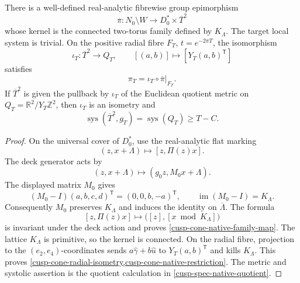 \begin{lemma}
\label{cusp-cone-native-descent}
There is a well-defined real-analytic fibrewise group epimorphism
\begin{equation}
 \overline\pi:N_0\setminus W
 \longrightarrow D_0^*\times\overline T^2
 \label{cusp-cone-native-family-map}
\end{equation}
whose kernel is the connected two-torus family defined by \(K_\Lambda\).
The target local system is trivial.  On the positive radial fibre \(F_T\),
\(t=e^{-2\pi T}\), the isomorphism
\begin{equation}
 \iota_T:\overline T^2\longrightarrow Q_T,\qquad
 [(a,b)]\longmapsto[Y_T(a,b)^{\mathsf T}]
 \label{cusp-cone-radial-isometry}
\end{equation}
satisfies
\begin{equation}
 \pi_T=\iota_T\circ\overline\pi|_{F_T}.
 \label{cusp-cone-native-restriction}
\end{equation}
If \(\overline T^2\) is given the pullback by \(\iota_T\) of the
Euclidean quotient metric on \(Q_T=\mathbb R^2/Y_T\mathbb Z^2\), then
\(\iota_T\) is an isometry and
\begin{equation}
 \operatorname{sys}(\overline T^2,g_T)
 =\operatorname{sys}(Q_T)\geq T-C.
 \label{cusp-cone-native-systole}
\end{equation}
\end{lemma}

\begin{proof}
On the universal cover of \(D_0^*\), use the real-analytic flat marking
\[
 (z,x+\Lambda)\longmapsto[z,\Pi(z)x].
\]
The deck generator acts by
\[
 (z,x+\Lambda)\longmapsto(g_0z,M_0x+\Lambda).
\]
The displayed matrix \(M_0\) gives
\begin{equation}
 (M_0-I)(a,b,c,d)^{\mathsf T}=(0,0,b,-a)^{\mathsf T},\qquad
 \operatorname{im}(M_0-I)=K_\Lambda.
 \label{cusp-cone-monodromy-image}
\end{equation}
Consequently \(M_0\) preserves \(K_\Lambda\) and induces the identity on
\(\overline\Lambda\).  The formula
\[
 [z,\Pi(z)x]\longmapsto
 \bigl([z],[x\bmod K_\Lambda]\bigr)
\]
is invariant under the deck action and proves
\cref{cusp-cone-native-family-map}.  The lattice \(K_\Lambda\) is primitive,
so the kernel is connected.  On the radial fibre, projection to the
\((e_2,e_4)\)-coordinates sends
\(a\widehat\gamma+b\widehat u\) to \(Y_T(a,b)^{\mathsf T}\) and kills
\(K_\Lambda\).  This proves
\cref{cusp-cone-radial-isometry,cusp-cone-native-restriction}.  The metric
and systolic assertion is the quotient calculation in
\cref{cusp-spec-native-quotient}.
\end{proof}

